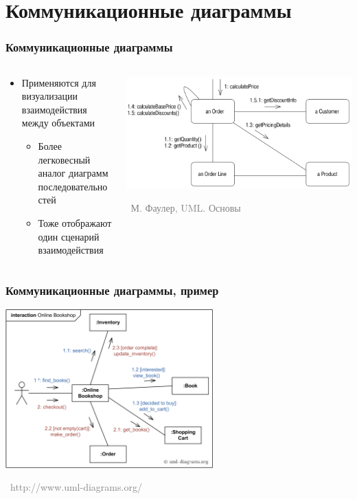 \documentclass[xetex,mathserif,serif]{beamer}
\newcommand{\attribution}[1] {
	\vspace{-5mm}\begin{flushright}\begin{scriptsize}\textcolor{gray}{\textcopyright\, #1}\end{scriptsize}\end{flushright}
}
\begin{document}
	\section{Коммуникационные диаграммы}

	\begin{frame}
		\frametitle{Коммуникационные диаграммы}
		\begin{columns}
			\begin{column}{0.5\textwidth}
				\begin{itemize}
					\item Применяются для визуализации взаимодействия между объектами
					\begin{itemize}
						\item Более легковесный аналог диаграмм последовательностей
						\item Тоже отображают один сценарий взаимодействия
					\end{itemize}
				\end{itemize}
			\end{column}
			\begin{column}{0.5\textwidth}
				\begin{center}
					\includegraphics[width=\textwidth]{communicationDiagram.png}
					\attribution{М. Фаулер, UML. Основы}
				\end{center}
			\end{column}
		\end{columns}
	\end{frame}

	\begin{frame}
		\frametitle{Коммуникационные диаграммы, пример}
		\begin{center}
			\includegraphics[width=0.6\textwidth]{communicationDiagramExample.png}
			\attribution{http://www.uml-diagrams.org/}
		\end{center}
	\end{frame}
\end{document}
